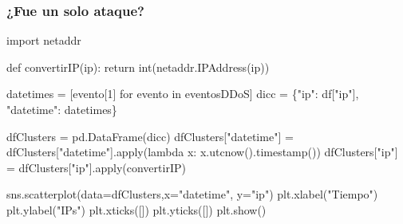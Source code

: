\documentclass[
  letterpaper,
  DIV=11,
  numbers=noendperiod]{scrartcl}
\newenvironment{Shaded}{\begin{snugshade}}{\end{snugshade}}
\newcommand{\BuiltInTok}[1]{\textcolor[rgb]{0.00,0.23,0.31}{#1}}
\newcommand{\ControlFlowTok}[1]{\textcolor[rgb]{0.00,0.23,0.31}{#1}}
\newcommand{\DecValTok}[1]{\textcolor[rgb]{0.68,0.00,0.00}{#1}}
\newcommand{\ImportTok}[1]{\textcolor[rgb]{0.00,0.46,0.62}{#1}}
\newcommand{\KeywordTok}[1]{\textcolor[rgb]{0.00,0.23,0.31}{#1}}
\newcommand{\NormalTok}[1]{\textcolor[rgb]{0.00,0.23,0.31}{#1}}
\newcommand{\OperatorTok}[1]{\textcolor[rgb]{0.37,0.37,0.37}{#1}}
\newcommand{\StringTok}[1]{\textcolor[rgb]{0.13,0.47,0.30}{#1}}
\begin{document}
\hypertarget{fue-un-solo-ataque}{%
\subsubsection{¿Fue un solo ataque?}\label{fue-un-solo-ataque}}

\begin{Shaded}
\begin{Highlighting}[]
\ImportTok{import}\NormalTok{ netaddr}

\KeywordTok{def}\NormalTok{ convertirIP(ip):}
    \ControlFlowTok{return} \BuiltInTok{int}\NormalTok{(netaddr.IPAddress(ip))}
    
\end{Highlighting}
\end{Shaded}

\begin{Shaded}
\begin{Highlighting}[]
\NormalTok{datetimes }\OperatorTok{=}\NormalTok{ [evento[}\DecValTok{1}\NormalTok{] }\ControlFlowTok{for}\NormalTok{ evento }\KeywordTok{in}\NormalTok{ eventosDDoS]}
\NormalTok{dicc }\OperatorTok{=}\NormalTok{ \{}\StringTok{"ip"}\NormalTok{: df[}\StringTok{"ip"}\NormalTok{],}
        \StringTok{"datetime"}\NormalTok{: datetimes\}}
\end{Highlighting}
\end{Shaded}

\begin{Shaded}
\begin{Highlighting}[]
\NormalTok{dfClusters }\OperatorTok{=}\NormalTok{ pd.DataFrame(dicc)}
\NormalTok{dfClusters[}\StringTok{"datetime"}\NormalTok{] }\OperatorTok{=}\NormalTok{ dfClusters[}\StringTok{"datetime"}\NormalTok{].}\BuiltInTok{apply}\NormalTok{(}\KeywordTok{lambda}\NormalTok{ x: x.utcnow().timestamp())}
\NormalTok{dfClusters[}\StringTok{"ip"}\NormalTok{] }\OperatorTok{=}\NormalTok{ dfClusters[}\StringTok{"ip"}\NormalTok{].}\BuiltInTok{apply}\NormalTok{(convertirIP)}
\end{Highlighting}
\end{Shaded}

\begin{Shaded}
\begin{Highlighting}[]
\NormalTok{sns.scatterplot(data}\OperatorTok{=}\NormalTok{dfClusters,x}\OperatorTok{=}\StringTok{"datetime"}\NormalTok{, y}\OperatorTok{=}\StringTok{"ip"}\NormalTok{)}
\NormalTok{plt.xlabel(}\StringTok{"Tiempo"}\NormalTok{)}
\NormalTok{plt.ylabel(}\StringTok{"IPs"}\NormalTok{)}
\NormalTok{plt.xticks([])}
\NormalTok{plt.yticks([])}
\NormalTok{plt.show()}
\end{Highlighting}
\end{Shaded}
\end{document}
